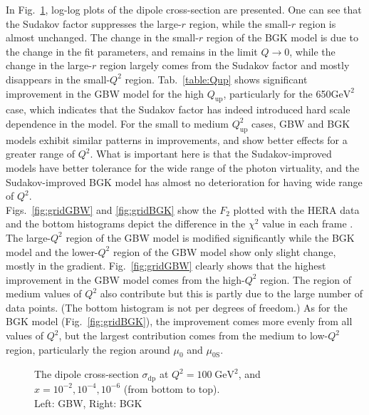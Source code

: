 \documentclass[11pt]{article}
\begin{document}
In Fig.~\ref{dipole}, log-log plots of the dipole cross-section are presented. One can see that the Sudakov factor suppresses the large-$r$ region, while the small-$r$ region is almost unchanged. The change in the small-$r$ region of the BGK model is due to the change in the fit parameters, and remains in the limit $Q\rightarrow0$, while the change in the large-$r$ region largely comes from the Sudakov factor and mostly disappears in the small-$Q^2$ region. 
Tab.~\ref{table:Qup} shows significant improvement in the GBW model for the high $Q_{\mathrm{up}}$, particularly for the 650$\mathrm{GeV^2}$ case, which indicates that the Sudakov factor has indeed introduced hard scale dependence in the model. For the small to medium $Q^2_{\mathrm{up}}$ cases, GBW and BGK models exhibit similar patterns in improvements, and show better effects for a greater range of $Q^2$.
What is important here is that the Sudakov-improved models have better tolerance for the wide range of the photon virtuality, and the Sudakov-improved BGK model has almost no deterioration for having wide range of $Q^2$.\\
Figs.~\ref{fig:gridGBW} and \ref{fig:gridBGK} show the $F_2$ plotted with the HERA data and the bottom histograms depict the difference in the $\chi^2$ value in each frame . 
The large-$Q^2$ region of the GBW model is modified significantly while the BGK model and the lower-$Q^2$ region of the GBW model show only slight change, mostly in the gradient. 
Fig.~\ref{fig:gridGBW} clearly shows that the highest improvement in the GBW model comes from the high-$Q^2$ region. The region of medium values of $Q^2$ also contribute but this is partly due to the large number of data points. (The bottom histogram is not per degrees of freedom.) As for the BGK model (Fig.~\ref{fig:gridBGK}), the improvement comes more evenly from all values of  $Q^2$, but the largest contribution comes from the medium to low-$Q^2$ region, particularly the region around $\mu_0$ and $\mu_{0\mathrm{S}}$.

\begin{figure}[H]
\caption{The dipole cross-section $\sigma_{\mathrm{dp}}$ at $Q^2=100\;\mathrm{GeV^2}$, and $x=10^{-2},10^{-4}, 10^{-6}$ (from bottom to top).\\Left: GBW, Right: BGK}
\label{dipole}
\end{figure}
\end{document}
